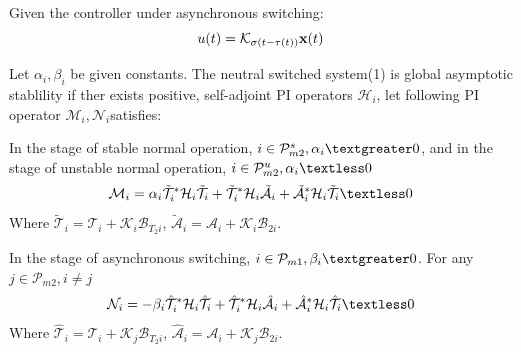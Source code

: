 \documentclass[twocolumn]{autart}    %
\begin{document}
\begin{thm}
Given the controller under asynchronous switching:
\begin{equation}
    u(t) = \mathcal{K}_{\sigma(t-\tau(t))}\bold{x}(t)
\end{equation}

Let $\alpha_{i},\beta_{i}$ be given constants. The neutral switched system(1) is global asymptotic stablility if ther exists positive, self-adjoint PI operators $\mathcal{H}_{i}$, let following PI operator $\mathcal{M}_{i},\mathcal{N}_{i}$satisfies:

In the stage of stable normal operation, $i \in \mathcal{P}_{m2}^{s},\alpha_{i} \textgreater 0$, and in the stage of unstable normal operation,  $i \in \mathcal{P}_{m2}^{u},\alpha_{i} \textless 0$
\begin{equation}
        \begin{aligned}
            \setlength{\arraycolsep}{0.9pt}
            \mathcal{M}_{i}  = \alpha_{i}\tilde{\mathcal{T}}_{i}^{*}\mathcal{H}_{i}\tilde{\mathcal{T}}_{i}+\tilde{\mathcal{T}}_{i}^{*}\mathcal{H}_{i}\tilde{\mathcal{A}}_{i}+\tilde{\mathcal{A}}_{i}^{*}\mathcal{H}_{i}\tilde{\mathcal{T}}_{i} \textless 0
        \end{aligned}
    \end{equation}
    Where $\tilde{\mathcal{T}}_{i} = \mathcal{T}_{i}+\mathcal{K}_{i}\mathcal{B}_{T_{2}i}$, $\tilde{\mathcal{A}}_{i} = \mathcal{A}_{i}+\mathcal{K}_{i}\mathcal{B}_{2i}$. 
    
In the stage of asynchronous switching,  $i \in \mathcal{P}_{m1},\beta_{i} \textgreater 0$. For any $j\in\mathcal{P}_{m2},i \ne j$
    \begin{equation}
        \begin{aligned}
            \setlength{\arraycolsep}{0.9pt}
\mathcal{N}_{i} = -\beta_{i}\hat{\mathcal{T}}_{i}^{*}\mathcal{H}_{i}\hat{\mathcal{T}}_{i}+\hat{\mathcal{T}}_{i}^{*}\mathcal{H}_{i}\hat{\mathcal{A}}_{i}+\hat{\mathcal{A}}_{i}^{*}\mathcal{H}_{i}\hat{\mathcal{T}}_{i} \textless 0
        \end{aligned}
    \end{equation}
    Where $\hat{\mathcal{T}}_{i} = \mathcal{T}_{i}+\mathcal{K}_{j}\mathcal{B}_{T_{2}i}$, $\hat{\mathcal{A}}_{i} = \mathcal{A}_{i}+\mathcal{K}_{j}\mathcal{B}_{2i}$.


\end{thm}
\end{document}
